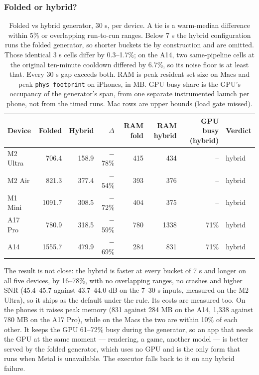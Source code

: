 \documentclass[11pt]{article}
\newcommand{\code}[1]{\texttt{#1}}
\begin{document}
\subsubsection{Folded or hybrid?}\label{sec:cs1-fold-vs-hybrid}

\begin{table}[h]
\centering
\small
\caption{Folded vs hybrid generator, 30 s, per device. A tie is a warm-median difference within 5\% or overlapping run-to-run ranges. Below 7 s the hybrid configuration runs the folded generator, so shorter buckets tie by construction and are omitted. Those identical 3 s cells differ by 0.3--1.7\%; on the A14, two same-pipeline cells at the original ten-minute cooldown differed by 6.7\%, so its noise floor is at least that. Every 30 s gap exceeds both. RAM is peak resident set size on Macs and peak \code{phys\_footprint} on iPhones, in MB. GPU busy share is the GPU's occupancy of the generator's span, from one separate instrumented launch per phone, not from the timed runs. Mac rows are upper bounds (load gate missed).}
\label{tab:cs1-fvh}
\begin{tabular}{lrrrrrrl}
\toprule
Device & Folded & Hybrid & $\Delta$ & RAM fold & RAM hybrid & GPU busy (hybrid) & Verdict \\
\midrule
M2 Ultra & 706.4 & 158.9 & $-$78\% & 415 & 434 & -- & hybrid \\
M2 Air   & 821.3 & 377.4 & $-$54\% & 393 & 376 & -- & hybrid \\
M1 Mini  & 1091.7 & 308.5 & $-$72\% & 404 & 375 & -- & hybrid \\
A17 Pro  & 780.9 & 318.5 & $-$59\% & 780 & 1338 & 71\% & hybrid \\
A14      & 1555.7 & 479.9 & $-$69\% & 284 & 831 & 71\% & hybrid \\
\bottomrule
\end{tabular}
\end{table}

The result is not close: the hybrid is faster at every bucket of 7 s and longer on all five devices, by 16--78\%, with no overlapping ranges, no crashes and higher SNR (45.4--45.7 against 43.7--44.0 dB on the 7--30 s inputs, measured on the M2 Ultra), so it ships as the default under the rule. Its costs are measured too. On the phones it raises peak memory (831 against 284 MB on the A14, 1,338 against 780 MB on the A17 Pro), while on the Macs the two are within 10\% of each other. It keeps the GPU 61--72\% busy during the generator, so an app that needs the GPU at the same moment --- rendering, a game, another model --- is better served by the folded generator, which uses no GPU and is the only form that runs when Metal is unavailable. The executor falls back to it on any hybrid failure.
\end{document}
